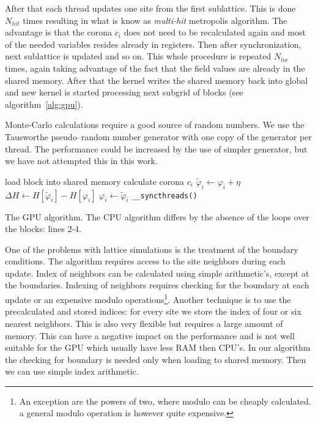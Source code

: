 \documentclass[a4paper]{llncs}
\newcommand{\vphi}{\varphi}
\begin{document}
After that each thread updates one site from the first sublattice. This is done
$N_{hit}$ times resulting in what is know as {\em multi-hit} metropolis
algorithm. The advantage is that the corona $c_i$ does not need to be
recalculated again and most of the needed variables resides already in
registers. Then after synchronization, next sublattice is updated and so on.
This whole procedure is repeated $N_{loc}$ times, again taking advantage of the
fact that the field values are already in the shared memory. After that the
kernel writes the shared memory back into global and new kernel is started
processing next subgrid of blocks (see algorithm~\ref{alg:gpu}).

Monte-Carlo calculations require a good source of random numbers. We use the
Tausworthe pseudo--random number generator\cite{howes_thomas07} with one copy
of the generator per thread. The performance could be increased by the use of
simpler generator, but we have not attempted this in this work.

\begin{algorithm}
\begin{algorithmic}[1]
      \State load block into shared memory
          \State calculate corona $c_i$
            \State $\widetilde{\vphi}_i \gets \vphi_i+\eta$
            \State $\Delta H \gets H[\widetilde{\vphi}_i]-H[\vphi_i]$
              \State $\vphi_i \gets \widetilde{\vphi}_i$
            \EndIf
          \EndFor
        \EndFor
        \State \verb!__syncthreads()!
      \EndFor
    \EndFor
  \EndFor
\EndFor
\end{algorithmic}
\caption{\label{alg:gpu} The GPU algorithm. The CPU algorithm differs
  by the absence of the loops over the blocks: lines 2-4.}
\end{algorithm}

One of the problems with lattice simulations is the treatment of the boundary
conditions. The algorithm requires access to the site neighbors during each
update. Index of neighbors can be calculated using simple arithmetic's, except
at the boundaries. Indexing of neighbors requires checking for the boundary at
each update or an expensive modulo operations\footnote{An exception are the
powers of two, where modulo can be cheaply calculated. a general modulo
operation is however quite expensive. }. Another technique is to use the
precalculated and stored indices: for every site we store the index of four or
six nearest neighbors. This is also very flexible but requires a large amount
of memory. This can have a negative impact on the performance and is not well
suitable for the GPU which usually have less RAM then CPU's. In our algorithm
the checking for boundary is needed only when loading to shared memory. Then we
can use simple index arithmetic.
\end{document}

